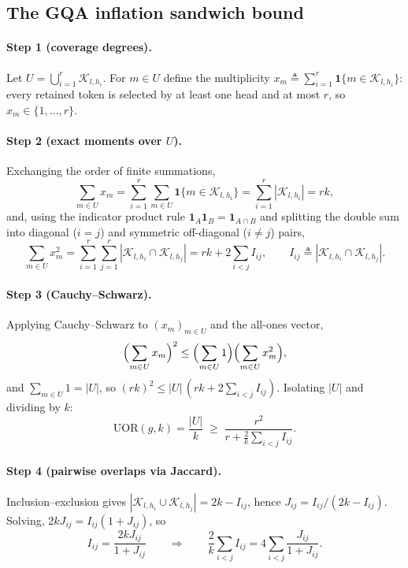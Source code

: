 \documentclass[final,5p,times,twocolumn]{elsarticle}
\theoremstyle{definition}
\theoremstyle{remark}
\newcommand{\UOR}{\mathrm{UOR}}
\newcommand{\TokSet}[1]{\mathcal{K}_{l,#1}}
\begin{document}
\subsection{The GQA inflation sandwich bound}
\label{app:sandwich}

\paragraph{Step 1 (coverage degrees).}
Let $U = \bigcup_{i=1}^r \TokSet{h_i}$. For $m \in U$ define the
multiplicity
 $x_m \triangleq \sum_{i=1}^r \mathbf{1}\{m \in \TokSet{h_i}\}$: every
retained token is selected by at least one head and at most $r$, so
 $x_m \in \{1,\dots,r\}$.

\paragraph{Step 2 (exact moments over $U$).}
Exchanging the order of finite summations,
\[
  \sum_{m \in U} x_m
  = \sum_{i=1}^r \sum_{m \in U} \mathbf{1}\{m \in \TokSet{h_i}\}
  = \sum_{i=1}^r |\TokSet{h_i}| = rk,
\]
and, using the indicator product rule
 $\mathbf{1}_A\mathbf{1}_B = \mathbf{1}_{A\cap B}$ and splitting the
double sum into diagonal ($i=j$) and symmetric off-diagonal ($i\neq j$)
pairs,
\[
  \sum_{m \in U} x_m^2
  = \sum_{i=1}^r\sum_{j=1}^r |\TokSet{h_i}\cap\TokSet{h_j}|
  = rk + 2\sum_{i<j} I_{ij},
  \qquad I_{ij} \triangleq |\TokSet{h_i}\cap\TokSet{h_j}|.
\]

\paragraph{Step 3 (Cauchy--Schwarz).}
Applying Cauchy--Schwarz to $(x_m)_{m\in U}$ and the all-ones vector,
\[
  \Bigl(\sum_{m\in U} x_m\Bigr)^{2}
  \le \Bigl(\sum_{m\in U} 1\Bigr)\Bigl(\sum_{m\in U} x_m^{2}\Bigr),
\]
and $\sum_{m\in U} 1 = |U|$, so
 $(rk)^{2} \le |U|\,(rk + 2\sum_{i<j} I_{ij})$. Isolating $|U|$ and
dividing by $k$:
\[
  \UOR(g,k) = \frac{|U|}{k}
  \;\ge\; \frac{r^{2}}{r + \tfrac{2}{k}\sum_{i<j} I_{ij}}.
\]

\paragraph{Step 4 (pairwise overlaps via Jaccard).}
Inclusion--exclusion gives
 $|\TokSet{h_i}\cup\TokSet{h_j}| = 2k - I_{ij}$, hence
 $J_{ij} = I_{ij}/(2k - I_{ij})$. Solving,
 $2kJ_{ij} = I_{ij}(1+J_{ij})$, so
\[
  I_{ij} = \frac{2kJ_{ij}}{1+J_{ij}}
  \qquad\Longrightarrow\qquad
  \frac{2}{k}\sum_{i<j} I_{ij}
  = 4\sum_{i<j} \frac{J_{ij}}{1+J_{ij}}.
\]
\end{document}
